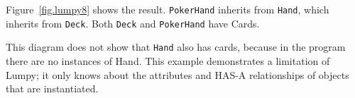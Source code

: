 \documentclass[10pt]{book}
\begin{document}
Figure~\ref{fig.lumpy8} shows the result.
{\tt PokerHand} inherits from {\tt Hand}, which inherits from {\tt Deck}.
Both {\tt Deck} and {\tt PokerHand} have Cards.

This diagram does not show that {\tt Hand} also has cards, because
in the program there are no instances of Hand.  This example
demonstrates a limitation of Lumpy; it only knows about the
attributes and HAS-A relationships of objects that are instantiated.

\printindex

\clearemptydoublepage
\end{document}
